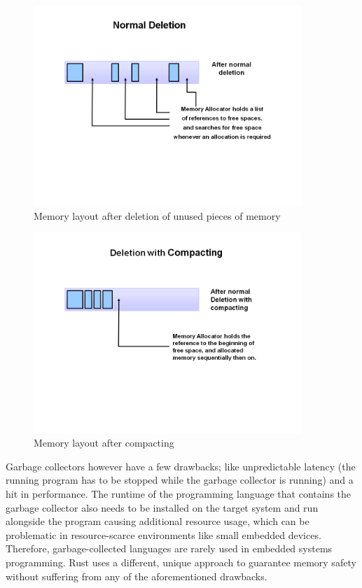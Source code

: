 \begin{figure}[htb]
    \centering
    \includegraphics[width=0.9\textwidth]{figures/fundamentals_garbage_collector_deletion.PNG}
    \caption[Illustration: Garbage Collector deleting marked memory \cite{java_garbage_collector}]{Memory layout after deletion of unused pieces of memory}
    \label{fig:gc_delete}
\end{figure}

\begin{figure}[H]
    \centering
    \includegraphics[width=0.9\textwidth]{figures/fundamentals_garbage_collector_compacting.PNG}
    \caption[Illustration: Garbage Collector compacting memory \cite{java_garbage_collector}]{Memory layout after compacting}
    \label{fig:gc_compact}
\end{figure}

Garbage collectors however have a few drawbacks; like unpredictable latency (the running program has to be stopped while the garbage collector is running) and a hit in performance.
The runtime of the programming language that contains the garbage collector also needs to be installed on the target system and run alongside the program
causing additional resource usage, which can be problematic in resource-scarce environments like small embedded devices.
Therefore, garbage-collected languages are rarely used in embedded systems programming.
Rust uses a different, unique approach to guarantee memory safety without suffering from any of the aforementioned drawbacks.

